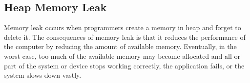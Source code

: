 \subsection{Heap Memory Leak}

Memory leak occurs when programmers create a memory in heap and forget to delete it. The
consequences of memory leak is that it reduces the performance of the computer by reducing the
amount of available memory. Eventually, in the worst case, too much of the available memory may
become allocated and all or part of the system or device stops working correctly, the application
fails, or the system slows down vastly.




\clearpage